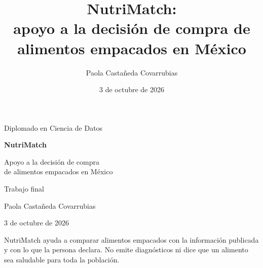 \documentclass[11pt,a4paper]{article}
\title{NutriMatch:\\apoyo a la decisión de compra de alimentos empacados en México}
\author{Paola Castañeda Covarrubias}
\date{3 de octubre de 2026}
\begin{document}
\begin{titlepage}
  \centering
  \vspace*{2.2cm}
  {\large Diplomado en Ciencia de Datos\par}
  \vspace{1.6cm}
  {\LARGE\bfseries NutriMatch\par}
  \vspace{0.7cm}
  {\Large Apoyo a la decisión de compra\\de alimentos empacados en México\par}
  \vspace{1.4cm}
  {\large Trabajo final\par}
  \vspace{2.2cm}
  Paola Castañeda Covarrubias\par
  \vspace{0.4cm}
  3 de octubre de 2026\par
  \vfill
  \begin{minipage}{0.86\textwidth}
    \small\centering
    NutriMatch ayuda a comparar alimentos empacados con la información publicada y con lo que la persona declara.
    No emite diagnósticos ni dice que un alimento sea saludable para toda la población.
  \end{minipage}
  \vspace{1.2cm}
\end{titlepage}

\tableofcontents
\newpage














\renewcommand{\refname}{Referencias}


\end{document}

